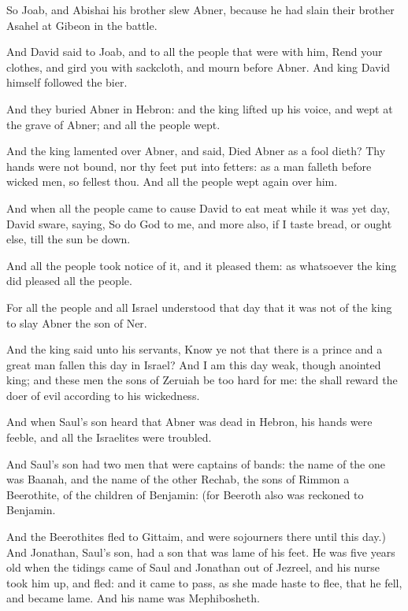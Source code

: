 \Verse So Joab, and Abishai his brother slew Abner, because he had slain their brother Asahel at Gibeon in the battle.

\Verse And David said to Joab, and to all the people that were with him, Rend your clothes, and gird you with sackcloth, and mourn before Abner. And king David himself followed the bier.

\Verse And they buried Abner in Hebron: and the king lifted up his voice, and wept at the grave of Abner; and all the people wept.

\Verse And the king lamented over Abner, and said, Died Abner as a fool dieth?  \Verse Thy hands were not bound, nor thy feet put into fetters: as a man falleth before wicked men, so fellest thou. And all the people wept again over him.

\Verse And when all the people came to cause David to eat meat while it was yet day, David sware, saying, So do God to me, and more also, if I taste bread, or ought else, till the sun be down.

\Verse And all the people took notice of it, and it pleased them: as whatsoever the king did pleased all the people.

\Verse For all the people and all Israel understood that day that it was not of the king to slay Abner the son of Ner.

\Verse And the king said unto his servants, Know ye not that there is a prince and a great man fallen this day in Israel?  \Verse And I am this day weak, though anointed king; and these men the sons of Zeruiah be too hard for me: the \LORD shall reward the doer of evil according to his wickedness.


\Chapter
\Verse And when Saul's son heard that Abner was dead in Hebron, his hands were feeble, and all the Israelites were troubled.

\Verse And Saul's son had two men that were captains of bands: the name of the one was Baanah, and the name of the other Rechab, the sons of Rimmon a Beerothite, of the children of Benjamin: (for Beeroth also was reckoned to Benjamin.

\Verse And the Beerothites fled to Gittaim, and were sojourners there until this day.)  \Verse And Jonathan, Saul's son, had a son that was lame of his feet. He was five years old when the tidings came of Saul and Jonathan out of Jezreel, and his nurse took him up, and fled: and it came to pass, as she made haste to flee, that he fell, and became lame. And his name was Mephibosheth.

